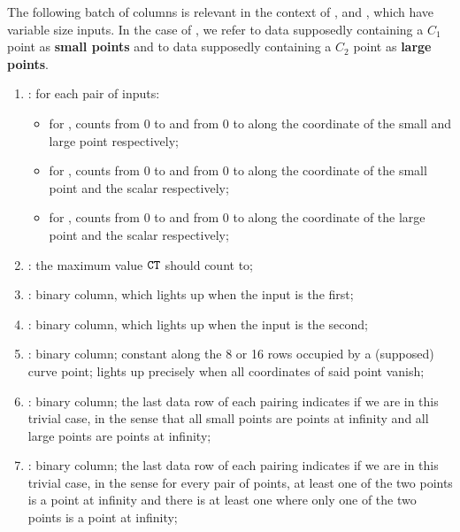 The following batch of columns is relevant in the context of ,  and , which have variable size inputs.
In the case of , we refer to data supposedly containing a $C_1$ point as \textbf{small points} and to data supposedly containing a $C_2$ point as \textbf{large points}.
\begin{enumerate}[resume]
      \item \ct:
            for each pair of inputs:
            \begin{itemize}
                  \item for , counts from 0 to \ctMaxSmallPoint{} and from 0 to \ctMaxLargePoint{} along the coordinate of the small and large point respectively;
                  \item for , counts from 0 to \ctMaxSmallPoint{} and from 0 to \ctMaxScalar{} along the coordinate of the small point and the scalar respectively;
                  \item for , counts from 0 to \ctMaxLargePoint{} and from 0 to \ctMaxScalar{} along the coordinate of the large point and the scalar respectively;
            \end{itemize}
      \item \maxCt:
            the maximum value $\texttt{CT}$ should count to;
      \item \isFirstInput:
            binary column, which lights up when the input is the first;
      \item \isSecondInput:
            binary column, which lights up when the input is the second;
      \item \isInfinity:
            binary column;
            constant along the 8 or 16 rows occupied by a (supposed) curve point;
            lights up precisely when all coordinates of said point vanish;
      \item \trivialAllInf: binary column; the last data row of each pairing indicates if we are in this trivial case, in the sense that all small points are points at infinity and all large points are points at infinity;
      \item \trivialWithMembershipCheck: binary column; the last data row of each pairing indicates if we are in this trivial case, in the sense for every pair of points, at least one of the two points is a point at infinity and there is at least one where only one of the two points is a point at infinity;


\end{enumerate}
